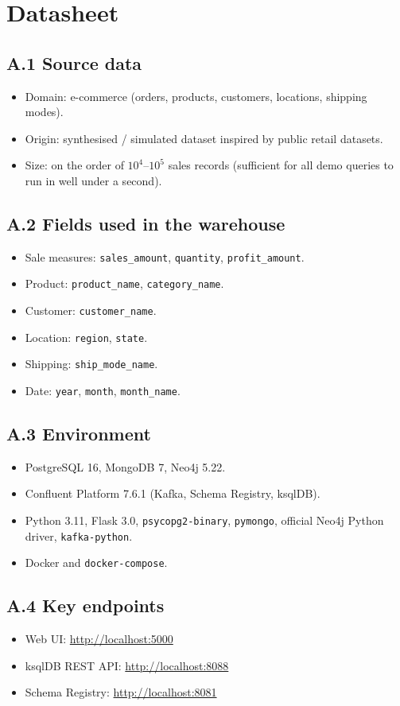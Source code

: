 \documentclass[11pt,a4paper]{article}
\begin{document}
\section{Datasheet}\label{app:datasheet}

\subsection*{A.1 Source data}

\begin{itemize}[leftmargin=*]
    \item Domain: e-commerce (orders, products, customers, locations,
          shipping modes).
    \item Origin: synthesised / simulated dataset inspired by public
          retail datasets.
    \item Size: on the order of $10^4$--$10^5$ sales records (sufficient
          for all demo queries to run in well under a second).
\end{itemize}

\subsection*{A.2 Fields used in the warehouse}

\begin{itemize}[leftmargin=*]
    \item Sale measures: \texttt{sales\_amount}, \texttt{quantity},
          \texttt{profit\_amount}.
    \item Product: \texttt{product\_name}, \texttt{category\_name}.
    \item Customer: \texttt{customer\_name}.
    \item Location: \texttt{region}, \texttt{state}.
    \item Shipping: \texttt{ship\_mode\_name}.
    \item Date: \texttt{year}, \texttt{month}, \texttt{month\_name}.
\end{itemize}

\subsection*{A.3 Environment}

\begin{itemize}[leftmargin=*]
    \item PostgreSQL 16, MongoDB 7, Neo4j 5.22.
    \item Confluent Platform 7.6.1 (Kafka, Schema Registry, ksqlDB).
    \item Python 3.11, Flask 3.0, \texttt{psycopg2-binary}, \texttt{pymongo},
          official Neo4j Python driver, \texttt{kafka-python}.
    \item Docker and \texttt{docker-compose}.
\end{itemize}

\subsection*{A.4 Key endpoints}

\begin{itemize}[leftmargin=*]
    \item Web UI: \url{http://localhost:5000}
    \item ksqlDB REST API: \url{http://localhost:8088}
    \item Schema Registry: \url{http://localhost:8081}
\end{itemize}
\end{document}
